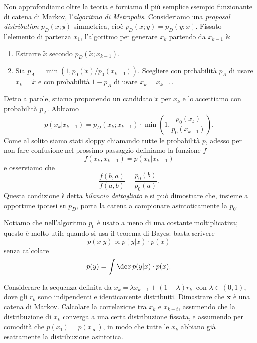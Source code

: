 Non approfondiamo oltre la teoria e forniamo il più semplice esempio
funzionante di catena di Markov, l'\emph{algoritmo di Metropolis}. Consideriamo
una \emph{proposal distribution} $p_D(x;y)$ simmetrica, cioè $p_D(x;y) =
p_D(y;x)$. Fissato l'elemento di partenza $x_1$, l'algoritmo per generare
$x_k$ partendo da $x_{k-1}$ è:
\begin{enumerate}
    \item Estrarre $\tilde x$ secondo $p_D(\tilde x;x_{k-1})$.
    \item Sia $p_A = \min(1, p_0(\tilde x)/p_0(x_{k-1}))$. Scegliere con
    probabilità $p_A$ di usare $x_k = \tilde x$ e con probabilità $1-p_A$
    di usare $x_k = x_{k-1}$.
\end{enumerate}
Detto a parole, stiamo proponendo un candidato $\tilde x$ per $x_k$ e
lo accettiamo con probabilità $p_A$. Abbiamo
\begin{equation}
	p(x_k|x_{k-1})
	= p_D(x_k;x_{k-1}) \cdot \min\left(1,\frac{p_0(x_k)}{p_0(x_{k-1})}\right).
\end{equation}
Come al solito siamo stati sloppy chiamando tutte le probabilità $p$, adesso per
non fare confusione nel prossimo passaggio definiamo la funzione $f$
\begin{equation}
    f(x_k, x_{k-1}) = p(x_k|x_{k-1})
\end{equation}
e osserviamo che
\begin{equation}
    \label{eq:db}
    \frac {f(b, a)} {f(a, b)} = \frac {p_0(b)} {p_0(a)}.
\end{equation}
Questa condizione è detta \emph{bilancio dettagliato} e si può dimostrare che,
insieme a opportune ipotesi su $p_D$, porta la catena a campionare
asintoticamente la $p_0$.

Notiamo che nell'algoritmo $p_0$ è usato a meno di una costante moltiplicativa;
questo è molto utile quando si usa il teorema di Bayes: basta scrivere
\begin{equation*}
	p(x|y) \propto p(y|x) \cdot p(x)
\end{equation*}
senza calcolare
\begin{equation*}
	p(y) = \int \de x\, p(y|x)\cdot p(x).
\end{equation*}

\begin{exercise}
    Considerare la sequenza definita da $x_k = \lambda x_{k-1} + (1-\lambda)
    r_k$, con $\lambda \in (0, 1)$, dove gli $r_k$ sono indipendenti e
    identicamente distribuiti. Dimostrare che $\mathbf x$ è una catena di
    Markov. Calcolare la correlazione tra $x_k$ e $x_{k+t}$, assumendo che la
    distribuzione di $x_k$ converga a una certa distribuzione fissata, e
    assumendo per comodità che $p(x_1) = p(x_\infty)$, in modo che tutte le
    $x_k$ abbiano già esattamente la distribuzione asintotica.
\end{exercise}

